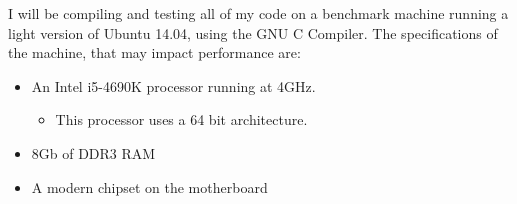 I will be compiling and testing all of my code on a benchmark machine running a light version of Ubuntu 14.04, using the GNU C Compiler. The specifications of the machine, that may impact performance are:
\begin{itemize}
\item An Intel i5-4690K processor running at 4GHz. 
\begin{itemize}
	\item This processor uses a 64 bit architecture.
\end{itemize}
\item 8Gb of DDR3 RAM
\item A modern chipset on the motherboard
\end{itemize}
